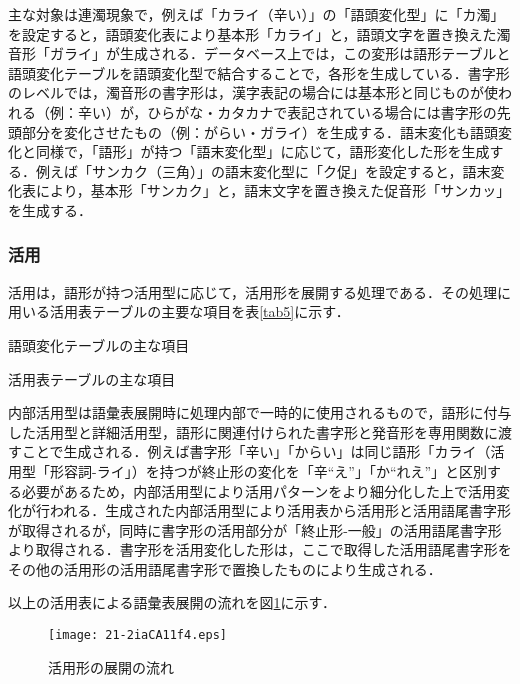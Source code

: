 \documentclass[japanese]{jnlp_1.4}
\begin{document}
主な対象は連濁現象で，例えば「カライ（辛い）」の「語頭変化型」に「カ濁」を設定すると，語頭変化表により基本形「カライ」と，語頭文字を置き換えた濁音形「ガライ」が生成される．データベース上では，この変形は語形テーブルと語頭変化テーブルを語頭変化型で結合することで，各形を生成している．書字形のレベルでは，濁音形の書字形は，漢字表記の場合には基本形と同じものが使われる（例：辛い）が，ひらがな・カタカナで表記されている場合には書字形の先頭部分を変化させたもの（例：がらい・ガライ）を生成する．語末変化も語頭変化と同様で，「語形」が持つ「語末変化型」に応じて，語形変化した形を生成する．例えば「サンカク（三角）」の語末変化型に「ク促」を設定すると，語末変化表により，基本形「サンカク」と，語末文字を置き換えた促音形「サンカッ」を生成する．


\subsubsection*{活用}

活用は，語形が持つ活用型に応じて，活用形を展開する処理である．その処理に用いる活用表テーブルの主要な項目を表\ref{tab5}に示す．

\begin{table}[b]
\caption{語頭変化テーブルの主な項目}
\label{tab4}

\end{table}
\begin{table}[b]
\caption{活用表テーブルの主な項目}
\label{tab5}

\end{table}

内部活用型は語彙表展開時に処理内部で一時的に使用されるもので，語形に付与した活用型と詳細活用型，語形に関連付けられた書字形と発音形を専用関数に渡すことで生成される．例えば書字形「辛い」「からい」は同じ語形「カライ（活用型「形容詞-ライ」）を持つが終止形の変化を「辛``え''」「か``れえ''」と区別する必要があるため，内部活用型により活用パターンをより細分化した上で活用変化が行われる．生成された内部活用型により活用表から活用形と活用語尾書字形が取得されるが，同時に書字形の活用部分が「終止形-一般」の活用語尾書字形より取得される．書字形を活用変化した形は，ここで取得した活用語尾書字形をその他の活用形の活用語尾書字形で置換したものにより生成される．

以上の活用表による語彙表展開の流れを図\ref{fig4}に示す．

\begin{figure}[t]
\begin{center}
\texttt{[image: 21-2iaCA11f4.eps]}
\end{center}
\caption{活用形の展開の流れ}
\label{fig4}
\end{figure}
\end{document}
